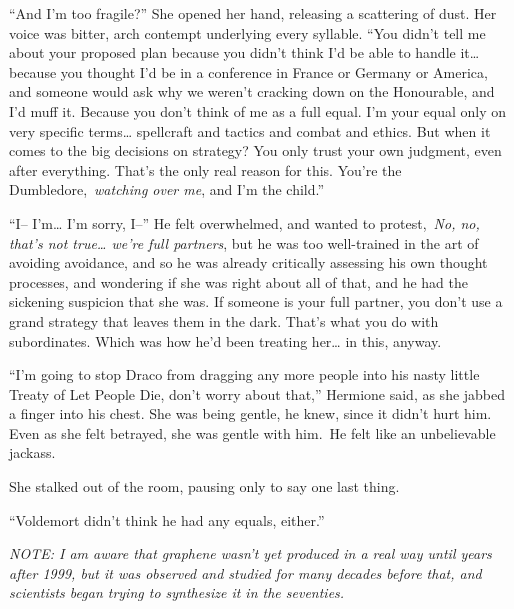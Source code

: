 ``And I'm too fragile?'' She opened her hand, releasing a scattering of
dust. Her voice was bitter, arch contempt underlying every syllable.
``You didn't tell me about your proposed plan because you didn't think
I'd be able to handle it\ldots{} because you thought I'd be in a
conference in France or Germany or America, and someone would ask why we
weren't cracking down on the Honourable, and I'd muff it. Because you
don't think of me as a full equal. I'm your equal only on very specific
terms\ldots{} spellcraft and tactics and combat and ethics. But when it
comes to the big decisions on strategy? You only trust your own
judgment, even after everything. That's the only real reason for this.
You're the Dumbledore,~\emph{watching over me}, and I'm the child.''

``I-- I'm\ldots{} I'm sorry, I--'' He felt overwhelmed, and wanted to
protest,~\emph{No, no, that's not true\ldots{} we're full partners}, but
he was too well-trained in the art of avoiding avoidance, and so he was
already critically assessing his own thought processes, and wondering if
she was right about all of that, and he had the sickening suspicion that
she was. If someone is your full partner, you don't use a grand strategy
that leaves them in the dark. That's what you do with subordinates.
Which was how he'd been treating her\ldots{} in this, anyway.

``I'm going to stop Draco from dragging any more people into his nasty
little Treaty of Let People Die, don't worry about that,'' Hermione
said, as she jabbed a finger into his chest. She was being gentle, he
knew, since it didn't hurt him. Even as she felt betrayed, she was
gentle with him.~He felt like an unbelievable jackass.

She stalked out of the room, pausing only to say one last thing.

``Voldemort didn't think he had any equals, either.''

\mybreak

\emph{NOTE: I am aware that graphene wasn't yet produced in a real way
until years after 1999, but it was observed and studied for many decades
before that, and scientists began trying to synthesize it in the
seventies.}
